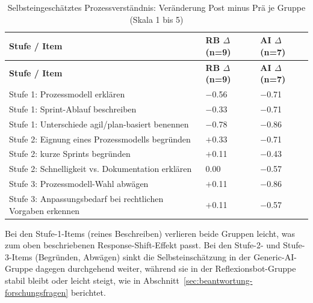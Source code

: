 \begingroup
\small
\setlength{\tabcolsep}{6pt}
\begin{longtable}{p{8.5cm} p{2cm} p{2cm}}
    \caption{Selbsteingeschätztes Prozessverständnis: Veränderung Post minus Prä je Gruppe (Skala 1 bis 5)}
    \label{tab:survey-prozessverstaendnis} \\
    \toprule
    \textbf{Stufe / Item} & \textbf{RB $\Delta$ (n=9)} & \textbf{AI $\Delta$ (n=7)} \\
    \midrule
    \endfirsthead
    \toprule
    \textbf{Stufe / Item} & \textbf{RB $\Delta$ (n=9)} & \textbf{AI $\Delta$ (n=7)} \\
    \midrule
    \endhead
    \bottomrule
    \endfoot
    Stufe 1: Prozessmodell erklären & $-$0.56 & $-$0.71 \\
    Stufe 1: Sprint-Ablauf beschreiben & $-$0.33 & $-$0.71 \\
    Stufe 1: Unterschiede agil/plan-basiert benennen & $-$0.78 & $-$0.86 \\
    Stufe 2: Eignung eines Prozessmodells begründen & $+$0.33 & $-$0.71 \\
    Stufe 2: kurze Sprints begründen & $+$0.11 & $-$0.43 \\
    Stufe 2: Schnelligkeit vs. Dokumentation erklären & 0.00 & $-$0.57 \\
    Stufe 3: Prozessmodell-Wahl abwägen & $+$0.11 & $-$0.86 \\
    Stufe 3: Anpassungsbedarf bei rechtlichen Vorgaben erkennen & $+$0.11 & $-$0.57 \\
\end{longtable}
\endgroup

Bei den Stufe-1-Items (reines Beschreiben) verlieren beide Gruppen leicht, was zum oben beschriebenen
Response-Shift-Effekt passt. Bei den Stufe-2- und Stufe-3-Items (Begründen, Abwägen) sinkt die
Selbsteinschätzung in der Generic-AI-Gruppe dagegen durchgehend weiter, während sie in der
Reflexionsbot-Gruppe stabil bleibt oder leicht steigt, wie in
Abschnitt~\ref{sec:beantwortung-forschungsfragen} berichtet.

